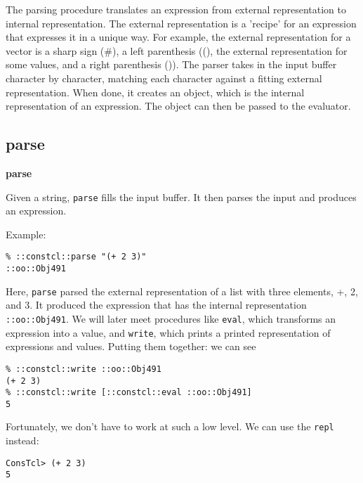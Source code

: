 \documentclass{report}
\begin{document}
The parsing procedure translates an expression from external representation to internal representation. The external representation is a 'recipe' for an expression that expresses it in a unique way. For example, the external representation for a vector is a sharp sign (\#), a left parenthesis ((), the external representation for some values, and a right parenthesis ()). The parser takes in the input buffer character by character, matching each character against a fitting external representation. When done, it creates an object, which is the internal representation of an expression. The object can then be passed to the evaluator.

\subsection{parse}
\label{parse}

\textbf{parse}


Given a string, \texttt{parse} fills the input buffer. It then parses the input and produces an expression.


Example:

\noindent\makebox[\linewidth]{\rule{\linewidth}{0.4pt}}
\begin{lstlisting}
% ::constcl::parse "(+ 2 3)"
::oo::Obj491
\end{lstlisting}
\noindent\makebox[\linewidth]{\rule{\linewidth}{0.4pt}}

Here, \texttt{parse} parsed the external representation of a list with three elements, +, 2, and 3. It produced the expression that has the internal representation \texttt{::oo::Obj491}. We will later meet procedures like \texttt{eval}, which transforms an expression into a value, and \texttt{write}, which prints a printed representation of expressions and values. Putting them together: we can see

\noindent\makebox[\linewidth]{\rule{\linewidth}{0.4pt}}
\begin{lstlisting}
% ::constcl::write ::oo::Obj491
(+ 2 3)
% ::constcl::write [::constcl::eval ::oo::Obj491]
5
\end{lstlisting}
\noindent\makebox[\linewidth]{\rule{\linewidth}{0.4pt}}

Fortunately, we don't have to work at such a low level. We can use the \texttt{repl} instead:

\noindent\makebox[\linewidth]{\rule{\linewidth}{0.4pt}}
\begin{lstlisting}
ConsTcl> (+ 2 3)
5
\end{lstlisting}
\noindent\makebox[\linewidth]{\rule{\linewidth}{0.4pt}}
\end{document}
